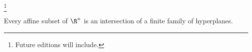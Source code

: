 
\footnote{Future editions will include.}


\begin{prop}
  Every affine subset of $\R^n$ is an intersection of a finite family of hyperplanes.
\end{prop}

\blankpage
